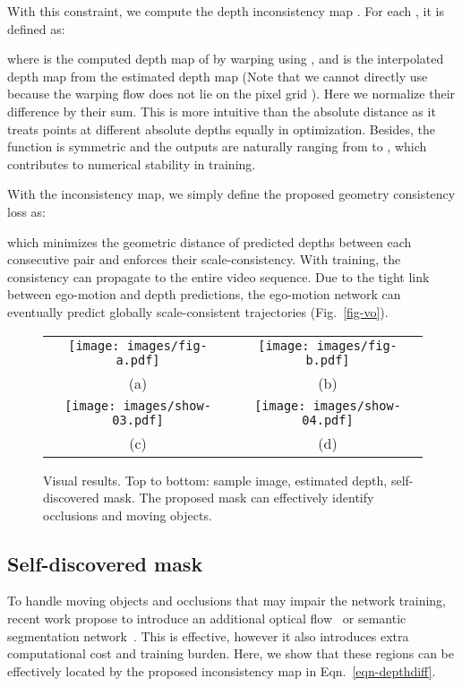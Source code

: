 \documentclass{article}
\newcommand{\figref}[1]{Fig.~\ref{#1}}
\newcommand{\equref}[1]{Eqn.~\ref{#1}}
\begin{document}
With this constraint, we compute the depth inconsistency map .
For each , it is defined as:

where  is the computed depth map of  by warping  using ,
and   is the interpolated depth map from the estimated depth map  (Note that we cannot directly use  because the warping flow does not lie on the pixel grid ).
Here we normalize their difference by their sum.
This is more intuitive than the absolute distance as it treats points at different absolute depths equally in optimization.
Besides, the function is symmetric and the outputs are naturally ranging from  to , which contributes to numerical stability in training.

With the inconsistency map, we simply define the proposed geometry consistency loss as:

which minimizes the geometric distance of predicted depths between each consecutive pair and enforces their scale-consistency.
With training, the consistency can propagate to the entire video sequence.
Due to the tight link between ego-motion and depth predictions, the ego-motion network can eventually predict globally scale-consistent trajectories (\figref{fig-vo}).


\begin{figure}[t]
\centering
\begin{tabular}{cc}
\texttt{[image: images/fig-a.pdf]}& 
\texttt{[image: images/fig-b.pdf]}\\
(a)  & (b) \\
\texttt{[image: images/show-03.pdf]}& 
\texttt{[image: images/show-04.pdf]}\\
(c) & (d) \\
\end{tabular}
\caption{Visual results. Top to bottom: sample image, estimated depth, self-discovered mask.
The proposed mask can effectively identify occlusions and moving objects.}
\label{fig-show}
 \vspace{-2mm}
\end{figure}

\subsection{Self-discovered mask}\label{sec-mask}

To handle moving objects and occlusions that may impair the network training,
recent work propose to introduce an additional optical flow~\cite{yin2018geonet,zou2018df,ranjan2019cc} or semantic segmentation network~\cite{jiao2018look}.
This is effective, however it also introduces extra computational cost and training burden.
Here, we show that these regions can be effectively located by the proposed inconsistency map  in \equref{eqn-depthdiff}.
\end{document}
